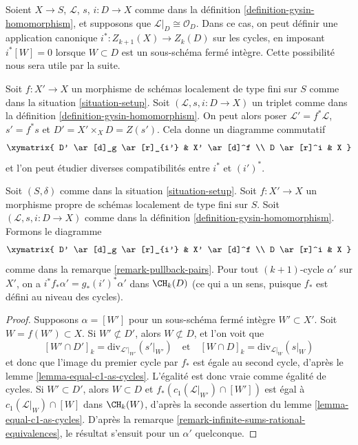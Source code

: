 \begin{remark}
\label{remark-gysin-on-cycles}
Soient $X \to S$, $\mathcal{L}$, $s$, $i : D \to X$ comme dans la
définition \ref{definition-gysin-homomorphism}, et supposons
que $\mathcal{L}|_D \cong \mathcal{O}_D$. Dans ce cas, on
peut définir une application canonique $i^* : Z_{k + 1}(X) \to Z_k(D)$
sur les cycles, en imposant $i^*[W] = 0$ lorsque $W \subset D$
est un sous-schéma fermé intègre.
Cette possibilité nous sera utile par la suite.
\end{remark}

\begin{remark}
\label{remark-pullback-pairs}
Soit $f : X' \to X$ un morphisme de schémas localement de type fini sur $S$
comme dans la situation \ref{situation-setup}. Soit $(\mathcal{L}, s, i : D \to X)$
un triplet comme dans la définition \ref{definition-gysin-homomorphism}.
On peut alors poser $\mathcal{L}' = f^*\mathcal{L}$, $s' = f^*s$ et
$D' = X' \times_X D = Z(s')$. Cela donne un diagramme commutatif
$$
\xymatrix{
D' \ar[d]_g \ar[r]_{i'} & X' \ar[d]^f \\
D \ar[r]^i & X
}
$$
et l'on peut étudier diverses compatibilités entre $i^*$ et $(i')^*$.
\end{remark}

\begin{lemma}
\label{lemma-closed-in-X-gysin}
Soit $(S, \delta)$ comme dans la situation \ref{situation-setup}.
Soit $f : X' \to X$ un morphisme propre de schémas
localement de type fini sur $S$.
Soit $(\mathcal{L}, s, i : D \to X)$ comme dans la
définition \ref{definition-gysin-homomorphism}.
Formons le diagramme
$$
\xymatrix{
D' \ar[d]_g \ar[r]_{i'} & X' \ar[d]^f \\
D \ar[r]^i & X
}
$$
comme dans la remarque \ref{remark-pullback-pairs}.
Pour tout $(k + 1)$-cycle $\alpha'$ sur $X'$, on a
$i^*f_*\alpha' = g_*(i')^*\alpha'$ dans $\CH_k(D)$
(ce qui a un sens, puisque $f_*$ est défini au niveau des cycles).
\end{lemma}

\begin{proof}
Supposons $\alpha = [W']$ pour un sous-schéma fermé intègre
$W' \subset X'$. Soit $W = f(W') \subset X$. Si $W' \not \subset D'$,
alors $W \not \subset D$, et l'on voit que
$$
[W' \cap D']_k = \text{div}_{\mathcal{L}'|_{W'}}({s'|_{W'}})
\quad\text{et}\quad
[W \cap D]_k = \text{div}_{\mathcal{L}|_W}(s|_W)
$$
et donc que l'image du premier cycle par $f_*$ est égale au second cycle, d'après le
lemme \ref{lemma-equal-c1-as-cycles}. L'égalité
est donc vraie comme égalité de cycles. Si $W' \subset D'$, alors
$W \subset D$ et $f_*(c_1(\mathcal{L}|_{W'}) \cap [W'])$
est égal à $c_1(\mathcal{L}|_W) \cap [W]$ dans $\CH_k(W)$, d'après la seconde
assertion du lemme \ref{lemma-equal-c1-as-cycles}.
D'après la remarque \ref{remark-infinite-sums-rational-equivalences},
le résultat s'ensuit pour un $\alpha'$ quelconque.
\end{proof}


